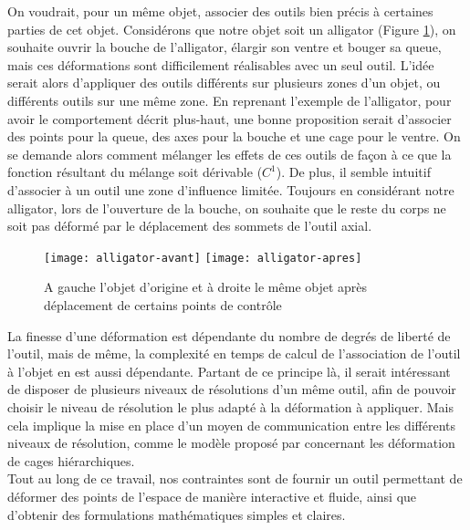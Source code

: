 On voudrait, pour un même objet, associer des outils bien précis à
certaines parties de cet objet. Considérons que notre objet soit un
alligator (Figure \ref{INTall}), on souhaite ouvrir la bouche de
l'alligator, élargir son ventre et bouger sa queue, mais ces
déformations sont difficilement réalisables avec un seul outil. L'idée
serait alors d'appliquer des outils différents sur plusieurs zones
d'un objet, ou différents outils sur une même zone. En reprenant
l'exemple de l'alligator, pour avoir le comportement décrit plus-haut,
une bonne proposition serait d'associer des points pour la queue, des
axes pour la bouche et une cage pour le ventre. On se demande alors
comment mélanger les effets de ces outils de façon à ce que la
fonction résultant du mélange soit dérivable ($C^1$). De plus, il
semble intuitif d'associer à un outil une zone d'influence
limitée. Toujours en considérant notre alligator, lors de l'ouverture
de la bouche, on souhaite que le reste du corps ne soit pas déformé
par le déplacement des sommets de l'outil axial.
\\

\begin{figure}[h]
  \texttt{[image: alligator-avant]}
  \texttt{[image: alligator-apres]}
  \caption{A gauche l'objet d'origine et à droite le même objet après
    déplacement de certains points de contrôle}
  \label{INTall}
\end{figure}

La finesse d'une déformation est dépendante du nombre de degrés de
liberté de l'outil, mais de même, la complexité en temps de calcul de
l'association de l'outil à l'objet en est aussi dépendante. Partant de
ce principe là, il serait intéressant de disposer de plusieurs niveaux
de résolutions d'un même outil, afin de pouvoir choisir le niveau de
résolution le plus adapté à la déformation à appliquer. Mais cela
implique la mise en place d'un moyen de communication entre les
différents niveaux de résolution, comme le modèle proposé par
\cite{Hur12} concernant les déformation de cages hiérarchiques.
\\

Tout au long de ce travail, nos contraintes sont de fournir un outil
permettant de déformer des points de l'espace de manière interactive
et fluide, ainsi que d'obtenir des formulations mathématiques simples
et claires.


